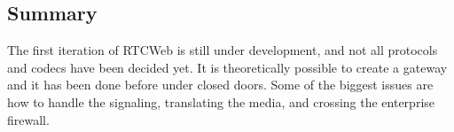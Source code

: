 

\subsection{Summary}
The first iteration of RTCWeb is still under development, and not all protocols and codecs have been decided yet. It is theoretically possible to create a gateway and it has been done before under closed doors. Some of the biggest issues are how to handle the signaling, translating the media, and crossing the enterprise firewall.


